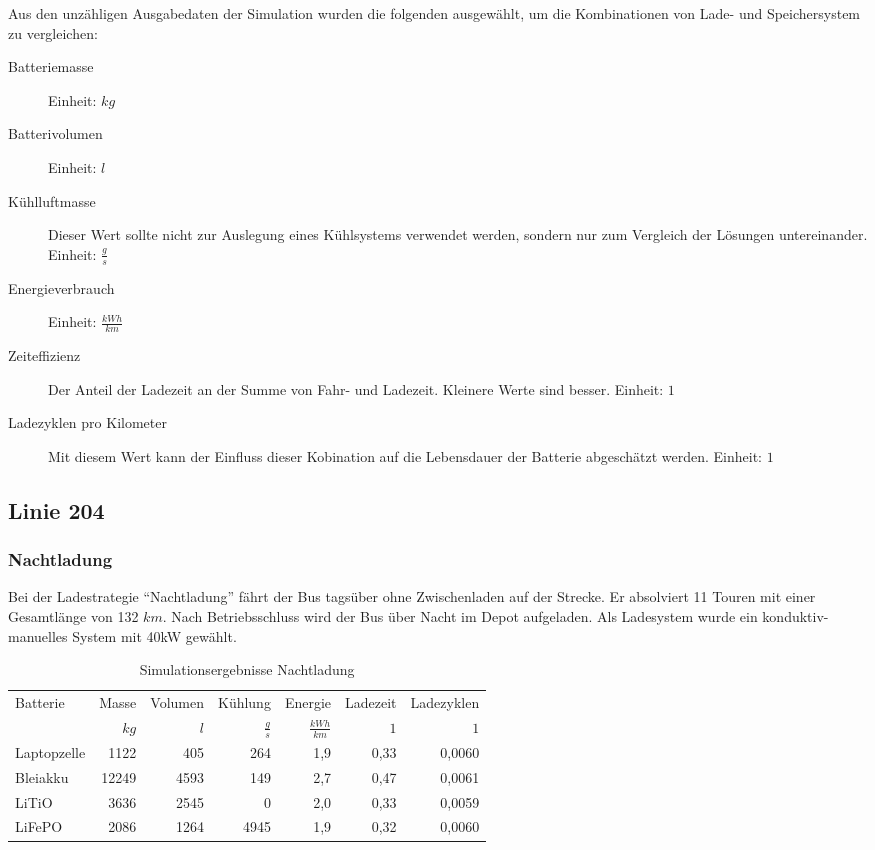 Aus den unzähligen Ausgabedaten der Simulation wurden die folgenden ausgewählt, um die Kombinationen von Lade- und Speichersystem zu vergleichen:
\begin{description}
	\item[Batteriemasse] Einheit: $kg$
	\item[Batterivolumen] Einheit: $l$
	\item[Kühlluftmasse] Dieser Wert sollte nicht zur Auslegung eines Kühlsystems verwendet werden, sondern nur zum Vergleich der Lösungen untereinander.\\
	Einheit: $\frac{g}{s}$
	\item[Energieverbrauch] Einheit: $\frac{kWh}{km}$
	\item[Zeiteffizienz] Der Anteil der Ladezeit an der Summe von Fahr- und Ladezeit. Kleinere Werte sind besser.
	Einheit: $1$
	\item[Ladezyklen pro Kilometer] Mit diesem Wert kann der Einfluss dieser Kobination auf die Lebensdauer der Batterie abgeschätzt werden.
	Einheit: $1$
\end{description}

\subsection{Linie 204}
\subsubsection{Nachtladung}
Bei der Ladestrategie "`Nachtladung"' fährt der Bus tagsüber ohne Zwischenladen auf der Strecke. Er absolviert 11 Touren mit einer Gesamtlänge von 132 $km$. Nach Betriebsschluss wird der Bus über Nacht im Depot aufgeladen. Als Ladesystem wurde ein konduktiv-manuelles System mit 40kW gewählt.

\begin{table}[h!]\centering
	\begin{tabular}{lrrrrrr}
		\toprule
		Batterie    & Masse & Volumen &       Kühlung &          Energie & Ladezeit & Ladezyklen \\
		            &  $kg$ &     $l$ & $\frac{g}{s}$ & $\frac{kWh}{km}$ &      $1$ &        $1$ \\ \midrule
		Laptopzelle &  1122 &     405 &           264 &              1,9 &       0,33   & 0,0060 \\
		Bleiakku    & 12249 &    4593 &           149 &              2,7 &       0,47   & 0,0061 \\
		LiTiO       &  3636 &    2545 &             0 &              2,0 &       0,33   & 0,0059 \\
		LiFePO      &  2086 &    1264 &          4945 &              1,9 &       0,32   & 0,0060 \\ \bottomrule
	\end{tabular}
	\caption{Simulationsergebnisse Nachtladung}
\end{table}
\FloatBarrier
